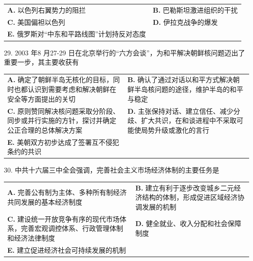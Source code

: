 \documentclass[UTF8,11pt]{ctexart}
\begin{document}
\begin{center}\begin{tabular}{>{\raggedright\arraybackslash}p{\dimexpr(\linewidth-4\tabcolsep)/2\relax}>{\raggedright\arraybackslash}p{\dimexpr(\linewidth-4\tabcolsep)/2\relax}}
\textbf{A.} 以色列右翼势力的阻拦 & \textbf{B.} 巴勒斯坦激进组织的干扰\\[.35em]
\textbf{C.} 美国偏袒以色列 & \textbf{D.} 伊拉克战争的爆发\\[.35em]
\textbf{E.} 俄罗斯对“中东和平路线图”计划持反对态度 & \\[.35em]\end{tabular}\end{center}

29. 2003 年8 月27-29 日在北京举行的“六方会谈”，为和平解决朝鲜核问题迈出了重要一步，其主要收获有


\begin{center}\begin{tabular}{>{\raggedright\arraybackslash}p{\dimexpr(\linewidth-4\tabcolsep)/2\relax}>{\raggedright\arraybackslash}p{\dimexpr(\linewidth-4\tabcolsep)/2\relax}}
\textbf{A.} 确定了朝鲜半岛无核化的目标，同时也都认识到需要考虑和解决朝鲜在安全等方面提出的关切 & \textbf{B.} 确认了通过对话以和平方式解决朝鲜半岛核问题的途径，维护半岛的和平与稳定\\[.35em]
\textbf{C.} 原则赞同解决核问题采取分阶段、同步或并行实施的方针，探讨并确定公正合理的总体解决方案 & \textbf{D.} 主张保持对话、建立信任、减少分歧、扩大共识，在和谈进程中不采取可能使局势升级或激化的言行\\[.35em]
\textbf{E.} 美朝双方初步达成了签署互不侵犯条约的共识 & \\[.35em]\end{tabular}\end{center}

30. 中共十六届三中全会强调，完善社会主义市场经济体制的主要任务是


\begin{center}\begin{tabular}{>{\raggedright\arraybackslash}p{\dimexpr(\linewidth-4\tabcolsep)/2\relax}>{\raggedright\arraybackslash}p{\dimexpr(\linewidth-4\tabcolsep)/2\relax}}
\textbf{A.} 完善公有制为主体、多种所有制经济共同发展的基本经济制度 & \textbf{B.} 建立有利于逐步改变城乡二元经济结构的体制，形成促进区域经济协调发展的机制\\[.35em]
\textbf{C.} 建设统一开放竞争有序的现代市场体系，完善宏观调控体系、行政管理体制和经济法律制度 & \textbf{D.} 健全就业、收入分配和社会保障制度\\[.35em]
\textbf{E.} 建立促进经济社会可持续发展的机制 & \\[.35em]\end{tabular}\end{center}
\end{document}
